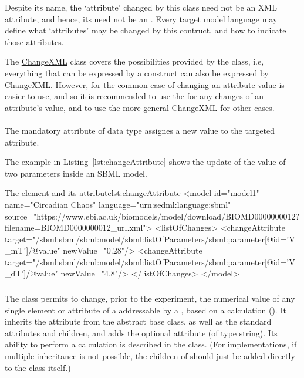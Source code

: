 Despite its name, the `attribute' changed by this class need not be an XML attribute, and hence, its  need not be an \XPath.  Every target model language may define what `attributes' may be changed by this contruct, and how to indicate those attributes.

The \hyperref[class:changeXml]{ChangeXML} class covers the possibilities provided by the  class, i.e, everything that can be expressed by a  construct can also be expressed by \hyperref[class:changeXml]{ChangeXML}. However, for the common case of changing an attribute value  is easier to use, and so it is recommended to use the  for any changes of an attribute's value, and to use the more general \hyperref[class:changeXml]{ChangeXML} for other cases.


\paragraph*{}
\label{sec:newValue}
The mandatory  attribute of data type  assignes a new value to the targeted attribute.

The example in Listing~\ref{lst:changeAttribute} shows the update of the value of two parameters inside an SBML model.

\begin{myXmlLst}{The  element and its  attribute}{lst:changeAttribute}
<model id="model1" name="Circadian Chaos" language="urn:sedml:language:sbml" 
	source="https://www.ebi.ac.uk/biomodels/model/download/BIOMD0000000012?filename=BIOMD0000000012_url.xml">
	<listOfChanges>
		<changeAttribute target="/sbml:sbml/sbml:model/sbml:listOfParameters/sbml:parameter[@id='V_mT']/@value" newValue="0.28"/>
  		<changeAttribute target="/sbml:sbml/sbml:model/sbml:listOfParameters/sbml:parameter[@id='V_dT']/@value" newValue="4.8"/>
	</listOfChanges>
</model>
\end{myXmlLst}


\subsubsection{}
\label{class:computeChange}
The  class permits to change, prior to the experiment, the numerical value of any single element or attribute of a \Model addressable by a \hyperref[sec:changeTarget]{}, based on a calculation ().  It inherits the  attribute from the \Change abstract base class, as well as the standard \SedBase attributes and children, and adds the optional attribute  (of type string).  Its ability to perform a calculation is described in the \Calculation class.  (For implementations, if multiple inheritance is not possible, the children of \Calculation should just be added directly to the \ComputeChange class itself.)

